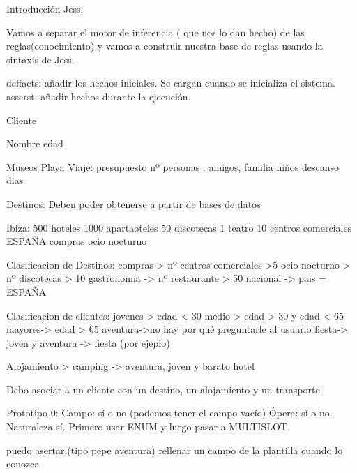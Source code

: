\documentclass[11pt, a4paper, spanish, openright, twoside]{book}
\begin{document}
	\begin{section}{Introducción}
		Jess:


			Vamos a separar el motor de inferencia ( que nos lo dan hecho) de las reglas(conocimiento) y vamos a construir 					nuestra base de reglas usando la sintaxis de Jess.

			deffacts: añadir los hechos iniciales. Se cargan cuando se inicializa el sistema.
			asserst: añadir hechos durante la ejecución.
			
			
				
					Cliente
				
			Nombre
			edad
			
			Museos
			Playa
			Viaje:
			presupuesto
			nº personas . amigos, familia niños
			descanso
			dias
			
			
				Destinos: Deben poder obtenerse a partir de bases de datos
				
			Ibiza:
				500 hoteles
				1000 apartaoteles
				50 discotecas
				1 teatro
				10 centros comerciales
				ESPAÑA
				compras
				ocio nocturno
				
				
				Clasificacion de Destinos:
					compras-> nº centros comerciales >5
					ocio nocturno-> nº discotecas > 10
					gastronomia -> nº restaurante > 50
					nacional -> pais = ESPAÑA
				
				Clasificacion de clientes:
					jovenes-> edad < 30
					medio-> edad > 30 y edad < 65
					mayores-> edad > 65
					aventura->no hay por qué preguntarle al usuario
					fiesta-> joven y aventura -> fiesta (por ejeplo)
					
				Alojamiento >
					camping -> aventura, joven y barato
					hotel
					
				
					
		Debo asociar a un cliente con un destino, un alojamiento y un transporte.
		
			
				Prototipo 0:
					Campo: sí o no (podemos tener el campo vacío)
					Ópera: sí o no.
					Naturaleza sí.
					Primero usar ENUM y luego pasar a MULTISLOT.
		
		puedo asertar:(tipo pepe aventura) 
		rellenar un campo de la plantilla cuando lo conozca
				
	\end{section}
\end{document}
